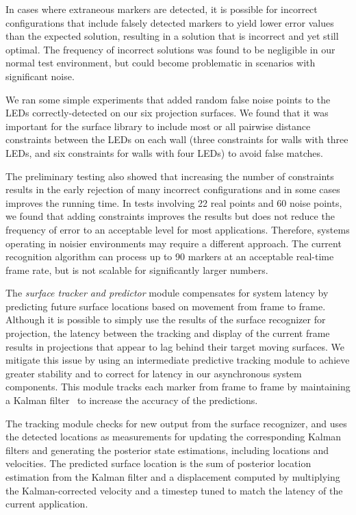\documentclass{thesis}
\begin{document}
In cases where extraneous markers are detected, it is possible for
incorrect configurations that include falsely detected markers to
yield lower error values than the expected solution, resulting in a
solution that is incorrect and yet still optimal. The frequency of
incorrect solutions was found to be negligible in our normal test
environment, but could become problematic in scenarios with
significant noise.  

We ran some simple experiments that added random false noise points to the LEDs correctly-detected on our six projection surfaces. We found that it was important for the surface library to include most or all pairwise distance constraints between the LEDs on each wall (three
constraints for walls with three LEDs, and six constraints for walls
with four LEDs) to avoid false matches.

The preliminary testing also showed that increasing the number of
constraints results in the early rejection of many incorrect
configurations and in some cases improves the running time. In tests
involving 22 real points and 60 noise points, we found that adding constraints improves the results but does not reduce the frequency of error to an acceptable level for most applications.  Therefore, systems operating in noisier environments may require a different approach. The current recognition algorithm can process up to 90 markers at an acceptable real-time frame rate, but is not scalable for significantly larger numbers.

The {\em surface tracker and predictor} module compensates for system
latency by predicting future surface locations based on movement from
frame to frame.  Although it is possible to simply use the results of
the surface recognizer for projection, the latency between the
tracking and display of the current frame results in projections that
appear to lag behind their target moving surfaces.  We mitigate this
issue by using an intermediate predictive tracking module to achieve
greater stability and to correct for latency in our asynchronous
system components.  This module tracks each marker from frame to frame by maintaining a Kalman filter~\cite{Kalman1960} to increase the accuracy of the predictions.

The tracking module checks for new output from the surface recognizer, and uses the detected locations as measurements for updating the corresponding Kalman filters and generating the posterior state estimations, including locations and velocities. The predicted surface location is the sum of posterior location estimation from the Kalman filter and a displacement computed by multiplying the Kalman-corrected velocity and a timestep tuned to match the latency of the current application.
\end{document}
